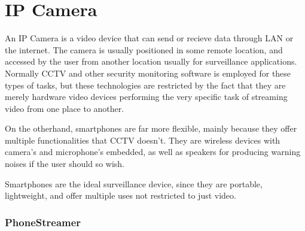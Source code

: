 %
%
%
%
%
%

\part{IP Camera}

An IP Camera is a video device that can send or recieve data through LAN or the internet. The camera is usually positioned in some remote location, and accessed by the user from another location usually for surveillance applications.  Normally CCTV and other security monitoring software is employed for these types of tasks, but these technologies are restricted by the fact that they are merely hardware video devices performing the very specific task of streaming video from one place to another.

On the otherhand, smartphones are far more flexible, mainly because they offer multiple functionalities that CCTV doesn't. They are wireless devices with camera's and microphone's embedded, as well as speakers for producing warning noises if the user should so wish.

Smartphones are the ideal surveillance device, since they are portable, lightweight, and offer multiple uses not restricted to just video.

\section{PhoneStreamer}


